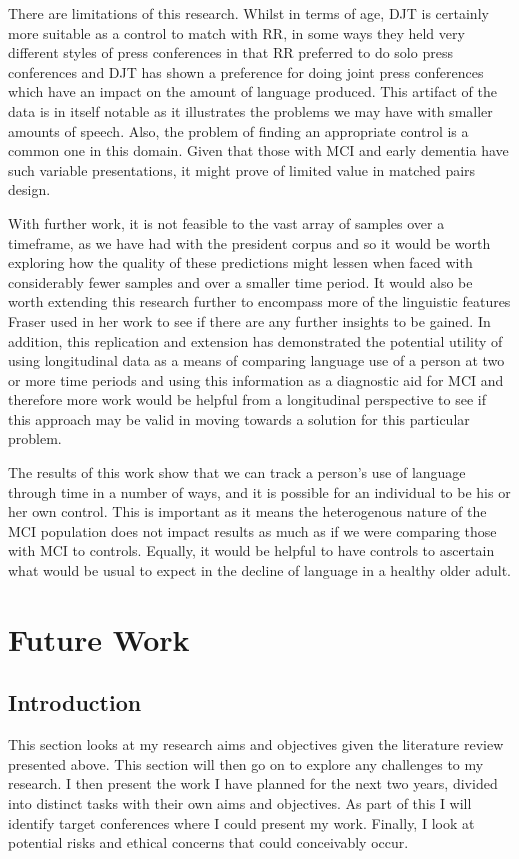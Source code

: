 \documentclass[10pt, letterpaper, twoside, openany]{book}
\begin{document}
There are limitations of this research. Whilst in terms of age, DJT is certainly more suitable as a control to match with RR, in some ways they held very different styles of press conferences in that RR preferred to do solo press conferences and DJT has shown a preference for doing joint press conferences which have an impact on the amount of language produced. This artifact of the data is in itself notable as it illustrates the problems we may have with smaller amounts of speech. Also, the problem of finding an appropriate control is a common one in this domain. Given that those with MCI and early dementia have such variable presentations, it might prove of limited value in matched pairs design. 
\par 
With further work, it is not feasible to the vast array of samples over a timeframe, as we have had with the president corpus and so it would be worth exploring how the quality of these predictions might lessen when faced with considerably fewer samples and over a smaller time period. It would also be worth extending this research further to encompass more of the linguistic features Fraser used in her work \cite{Fraser2015} to see if there are any further insights to be gained. In addition, this replication and extension has demonstrated the potential utility of using longitudinal data as a means of comparing language use of a person at two or more time periods and using this information as a diagnostic aid for MCI and therefore more work would be helpful from a longitudinal perspective to see if this approach may be valid in moving towards a solution for this particular problem. 
\par 
The results of this work show that we can track a person's use of language through time in a number of ways, and it is possible for an individual to be his or her own control. This is important as it means the heterogenous nature of the MCI population does not impact results as much as if we were comparing those with MCI to controls. Equally, it would be helpful to have controls to ascertain what would be usual to expect in the decline of language in a healthy older adult. 

\chapter{Future Work}
\section{Introduction}
This section looks at my research aims and objectives given the literature review presented above. This section will then go on to explore any challenges to my research. I then present the work I have planned for the next two years, divided into distinct tasks with their own aims and objectives. As part of this I will identify target conferences where I could present my work. Finally, I look at potential risks and ethical concerns that could conceivably occur.
\end{document}
